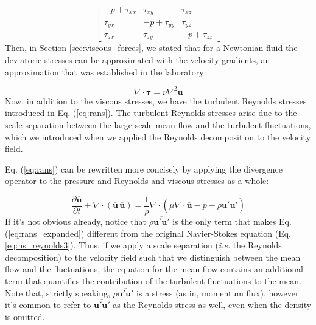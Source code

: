 \documentclass[12pt]{article}
\numberwithin{equation}{section}
\numberwithin{figure}{section}
\numberwithin{table}{section}
\begin{document}
\begin{equation}
  \begin{bmatrix}
    -p + \tau_{xx} & \tau_{xy} & \tau_{xz} \\
    \tau_{yx} & -p + \tau_{yy} & \tau_{yz} \\
    \tau_{zx} & \tau_{zy} & -p + \tau_{zz}
  \end{bmatrix}
\end{equation}
Then, in Section \ref{sec:viscous_forces}, we stated that for a Newtonian fluid
the deviatoric stresses can be approximated with the velocity gradients, an
approximation that was established in the laboratory:

\begin{equation}
  \nabla \cdot \boldsymbol{\tau} = \nu \nabla^2 \mathbf{u}
\end{equation}
Now, in addition to the viscous stresses, we have the turbulent Reynolds stresses
introduced in Eq. (\ref{eq:rans}).
The turbulent Reynolds stresses arise due to the scale separation between the
large-scale mean flow and the turbulent fluctuations, which we introduced when
we applied the Reynolds decomposition to the velocity field.

Eq. (\ref{eq:rans}) can be rewritten more concisely by applying the divergence
operator to the pressure and Reynolds and viscous stresses as a whole:

\begin{equation}
  \frac{\partial \overline{\mathbf{u}}}{\partial t} +
  \nabla \cdot (\overline{\mathbf{u}}\, \overline{\mathbf{u}}) =
  \frac{1}{\rho} \nabla \cdot \left( \mu \nabla \cdot \overline{\mathbf{u}} - p - \rho \overline{\mathbf{u}' \mathbf{u}'} \right)
  \label{eq:rans_expanded}
\end{equation}
If it's not obvious already, notice that $\rho \overline{\mathbf{u}' \mathbf{u}'}$
is the only term that makes Eq. (\ref{eq:rans_expanded}) different from the
original Navier-Stokes equation (Eq. \ref{eq:ns_reynolds3}).
Thus, if we apply a scale separation (\textit{i.e.} the Reynolds decomposition)
to the velocity field such that we distinguish between the mean flow and the
fluctuations, the equation for the mean flow contains an additional term that
quantifies the contribution of the turbulent fluctuations to the mean.
Note that, strictly speaking, $\rho \overline{\mathbf{u}' \mathbf{u}'}$ is a
stress (as in, momentum flux), however it's common to refer to
$\overline{\mathbf{u}' \mathbf{u}'}$ as the Reynolds stress as well, even when
the density is omitted.
\end{document}
